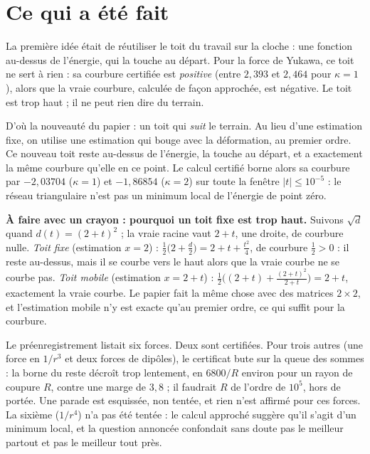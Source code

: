 \section*{Ce qui a été fait}

La première idée était de réutiliser le \og toit\fg{} du travail sur la cloche : une fonction
au-dessus de l'énergie, qui la touche au départ. Pour la force de Yukawa, ce toit ne sert à
rien : sa courbure certifiée est \emph{positive} (entre $2{,}393$ et $2{,}464$ pour $\kappa=1$),
alors que la vraie courbure, calculée de façon approchée, est négative. Le toit est trop haut ;
il ne peut rien dire du terrain.

D'où la nouveauté du papier : un toit qui \emph{suit} le terrain. Au lieu d'une estimation
fixe, on utilise une estimation qui bouge avec la déformation, au premier ordre. Ce nouveau toit
reste au-dessus de l'énergie, la touche au départ, et a exactement la même courbure qu'elle en
ce point. Le calcul certifié borne alors sa courbure par $-2{,}03704$ ($\kappa=1$) et
$-1{,}86854$ ($\kappa=2$) sur toute la fenêtre $|t|\le10^{-5}$ : le réseau triangulaire n'est
pas un minimum local de l'énergie de point zéro.

\begin{encadre}
\textbf{À faire avec un crayon : pourquoi un toit fixe est trop haut.} Suivons $\sqrt{d}$ quand
$d(t)=(2+t)^2$ ; la vraie racine vaut $2+t$, une droite, de courbure nulle.
\emph{Toit fixe} (estimation $x=2$) :
$\tfrac12\bigl(2+\tfrac{d}{2}\bigr)=2+t+\tfrac{t^2}{4}$, de courbure $\tfrac12>0$ : il reste
au-dessus, mais il se courbe vers le haut alors que la vraie courbe ne se courbe pas.
\emph{Toit mobile} (estimation $x=2+t$) : $\tfrac12\bigl((2+t)+\tfrac{(2+t)^2}{2+t}\bigr)=2+t$,
exactement la vraie courbe. Le papier fait la même chose avec des matrices $2\times2$, et
l'estimation mobile n'y est exacte qu'au premier ordre, ce qui suffit pour la courbure.
\end{encadre}

Le préenregistrement listait six forces. Deux sont certifiées. Pour trois autres (une force en
$1/r^3$ et deux forces de dipôles), le certificat bute sur la queue des sommes : la borne du
reste décroît trop lentement, en $6800/R$ environ pour un rayon de coupure $R$, contre une marge
de $3{,}8$ ; il faudrait $R$ de l'ordre de $10^5$, hors de portée. Une parade est esquissée, non
tentée, et rien n'est affirmé pour ces forces. La sixième ($1/r^4$) n'a pas été tentée : le calcul
approché suggère qu'il s'agit d'un minimum local, et la question annoncée confondait sans doute
\og pas le meilleur partout\fg{} et \og pas le meilleur tout près\fg{}.


